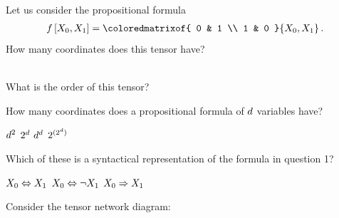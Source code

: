 \documentclass[12pt,answers]{exam}
\begin{document}
    \begin{questions}
        \question Let us consider the propositional formula
        \begin{align*}
            \formulaat{\catvariableof{0},\catvariableof{1}}
            =
            \coloredmatrixof{
                0 & 1 \\
                1 & 0
            }{\catvariableof{0},\catvariableof{1}} \, .
        \end{align*}
        How many coordinates does this tensor have? \\
        \begin{oneparcheckboxes}
        \end{oneparcheckboxes}\\
        What is the order of this tensor? \\
        \begin{oneparcheckboxes}
        \end{oneparcheckboxes}

        \question
        How many coordinates does a propositional formula of $d$ variables have? \\
        \begin{oneparcheckboxes}
            \choice $d^2$
            \correctchoice $2^d$
            \choice ${d}^d$
            \choice $2^{(2^{d})}$
        \end{oneparcheckboxes}

        \question
        Which of these is a syntactical representation of the formula in question 1? \\
        \begin{oneparcheckboxes}
            \choice $X_{0}\Leftrightarrow X_{1}$
            \correctchoice $X_{0}\Leftrightarrow \lnot X_{1}$
            \choice $X_{0}\Rightarrow X_{1}$
        \end{oneparcheckboxes}

        \question
        Consider the tensor network diagram:
\end{questions}
\end{document}
